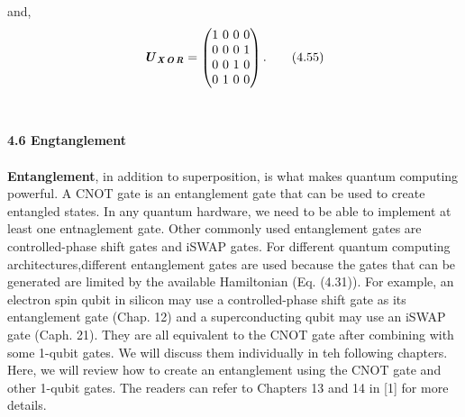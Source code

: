 \documentclass{article}
\newcommand{\bfit}[1]{\textbf{\textit{#1}}}
\begin{document}
and,
\begin{equation}
    \bfit{U}_{\bfit{X\! O\! R}}=\begin{pmatrix}
        1\ 0\ 0\ 0\\0\ 0\ 0\ 1\\0\ 0\ 1\ 0\\0\ 1\ 0\ 0
    \end{pmatrix}. \tag{4.55}
\end{equation}
\\\\
\textbf{\large 4.6 Engtanglement}
\\\\
\textbf{Entanglement}, in addition to superposition, is what makes quantum computing
powerful. A CNOT gate is an entanglement gate that can be used to create
entangled states. In any quantum hardware, we need to be able to implement at least
one entnaglement gate. Other commonly used entanglement gates are controlled-phase shift gates
and iSWAP gates. For different quantum computing architectures,different entanglement gates
are used because the gates that can be generated are limited by the available Hamiltonian (Eq. (4.31)).
For example, an electron spin qubit in silicon may use a controlled-phase shift gate as its entanglement
gate  (Chap. 12) and a superconducting qubit may use an iSWAP gate (Caph. 21).
They are all equivalent to the CNOT gate after combining with some 1-qubit gates.
We will discuss them individually in teh following chapters. Here, we will review how
to create an entanglement using the CNOT gate and other 1-qubit gates.
The readers can refer to Chapters 13 and 14 in [1] for more details.
\end{document}
